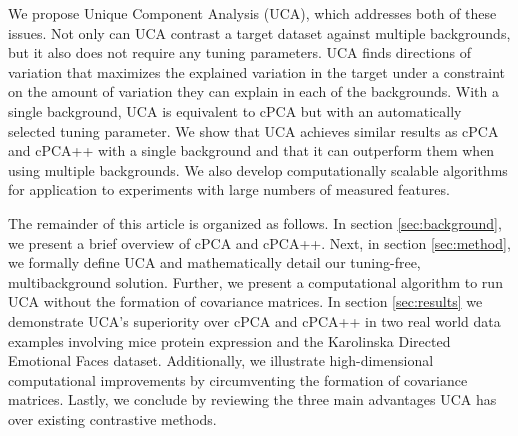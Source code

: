 \documentclass[12pt]{article}
\begin{document}
We propose Unique Component Analysis (UCA), which addresses both of these issues. %
Not only can UCA contrast a target dataset against multiple backgrounds, but it also does not require any tuning parameters. UCA finds directions of variation that maximizes the explained variation in the target under a constraint on the amount of variation they can explain in each of the backgrounds. With a single background, UCA is equivalent to cPCA but with an automatically selected tuning parameter. We show that UCA achieves similar results as cPCA and cPCA++ with a single background and that it can outperform them when using multiple backgrounds. We also develop computationally scalable algorithms for application to experiments with large numbers of measured features.

The remainder of this article is organized as follows. In section \ref{sec:background}, we present a brief overview of cPCA and cPCA++. Next, in section \ref{sec:method}, we formally define UCA and mathematically detail our tuning-free, multibackground solution. Further, we present a computational algorithm to run UCA without the formation of covariance matrices. In section \ref{sec:results} we demonstrate UCA's superiority over cPCA and cPCA++ in two real world data examples involving mice protein expression and the Karolinska Directed Emotional Faces dataset. Additionally, we illustrate high-dimensional computational improvements by circumventing the formation of covariance matrices. Lastly, we conclude by reviewing the three main advantages UCA has over existing contrastive methods.
\end{document}
